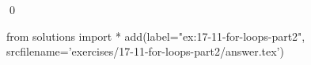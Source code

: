 
\begin{ex}
  \label{ex:17-11-for-loops-part2}
  
  \qed
\end{ex}
\begin{python0}
from solutions import *
add(label="ex:17-11-for-loops-part2",
    srcfilename='exercises/17-11-for-loops-part2/answer.tex')
\end{python0}
